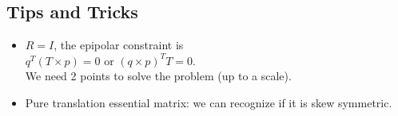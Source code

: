 \subsection*{Tips and Tricks}
\begin{itemize}
  \item $R = I$, the epipolar constraint is\\
    $q^T ( T \times p) = 0$ or $(q \times p)^T T = 0$.\\
    We need 2 points to solve the problem (up to a scale).
  \item Pure translation essential matrix: we can recognize if it is
    skew symmetric.
\end{itemize}
